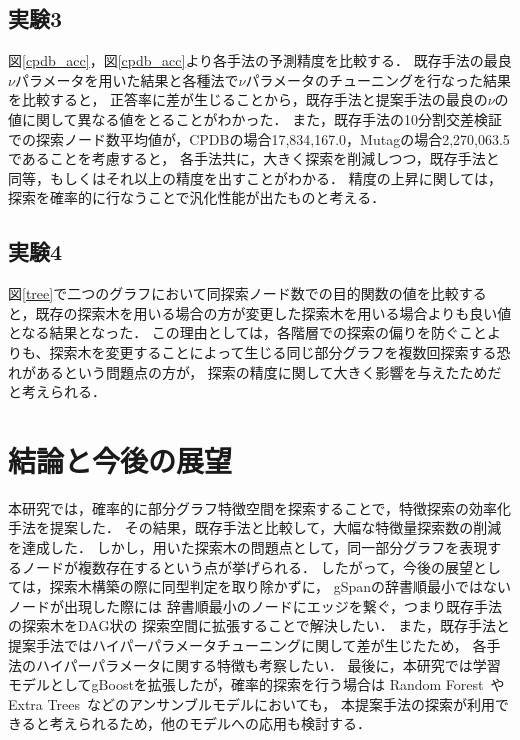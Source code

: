 \section{実験3}
図\ref{cpdb_acc}，図\ref{cpdb_acc}より各手法の予測精度を比較する．
既存手法の最良$\nu$パラメータを用いた結果と各種法で$\nu$パラメータのチューニングを行なった結果を比較すると，
正答率に差が生じることから，既存手法と提案手法の最良の$\nu$の値に関して異なる値をとることがわかった．
また，既存手法の10分割交差検証での探索ノード数平均値が，CPDBの場合17,834,167.0，Mutagの場合2,270,063.5であることを考慮すると，
各手法共に，大きく探索を削減しつつ，既存手法と同等，もしくはそれ以上の精度を出すことがわかる．
精度の上昇に関しては，探索を確率的に行なうことで汎化性能が出たものと考える．

\section{実験4}
図\ref{tree}で二つのグラフにおいて同探索ノード数での目的関数の値を比較すると，既存の探索木を用いる場合の方が変更した探索木を用いる場合よりも良い値となる結果となった．
この理由としては，各階層での探索の偏りを防ぐことよりも、探索木を変更することによって生じる同じ部分グラフを複数回探索する恐れがあるという問題点の方が，
探索の精度に関して大きく影響を与えたためだと考えられる．


\chapter{結論と今後の展望}
本研究では，確率的に部分グラフ特徴空間を探索することで，特徴探索の効率化手法を提案した．
その結果，既存手法と比較して，大幅な特徴量探索数の削減を達成した．
しかし，用いた探索木の問題点として，同一部分グラフを表現するノードが複数存在するという点が挙げられる．
したがって，今後の展望としては，探索木構築の際に同型判定を取り除かずに，
gSpanの辞書順最小ではないノードが出現した際には
辞書順最小のノードにエッジを繋ぐ，つまり既存手法の探索木をDAG状の
探索空間に拡張することで解決したい．
また，既存手法と提案手法ではハイパーパラメータチューニングに関して差が生じたため，
各手法のハイパーパラメータに関する特徴も考察したい．
最後に，本研究では学習モデルとしてgBoostを拡張したが，確率的探索を行う場合は
Random Forest~\cite{RF}やExtra Trees~\cite{ET}などのアンサンブルモデルにおいても，
本提案手法の探索が利用できると考えられるため，他のモデルへの応用も検討する．

